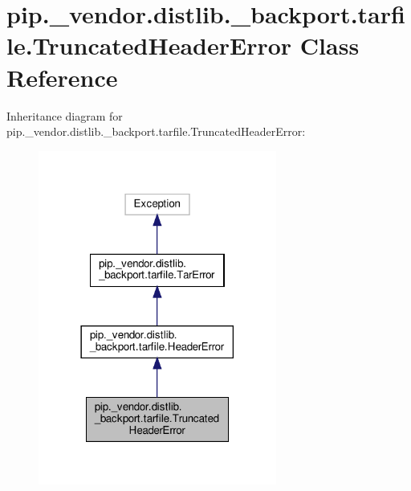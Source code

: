\hypertarget{classpip_1_1__vendor_1_1distlib_1_1__backport_1_1tarfile_1_1TruncatedHeaderError}{}\section{pip.\+\_\+vendor.\+distlib.\+\_\+backport.\+tarfile.\+Truncated\+Header\+Error Class Reference}
\label{classpip_1_1__vendor_1_1distlib_1_1__backport_1_1tarfile_1_1TruncatedHeaderError}


Inheritance diagram for pip.\+\_\+vendor.\+distlib.\+\_\+backport.\+tarfile.\+Truncated\+Header\+Error\+:
\nopagebreak
\begin{figure}[H]
\begin{center}
\leavevmode
\includegraphics[width=222pt]{classpip_1_1__vendor_1_1distlib_1_1__backport_1_1tarfile_1_1TruncatedHeaderError__inherit__graph}
\end{center}
\end{figure}



